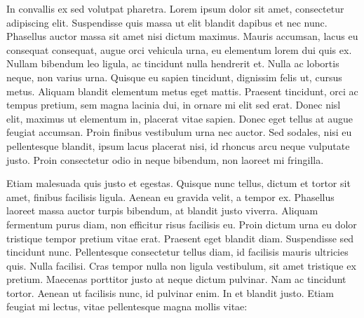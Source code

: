 \documentclass[12pt]{article}
\begin{document}
    In convallis ex sed volutpat pharetra. Lorem ipsum dolor sit amet, consectetur adipiscing elit. Suspendisse quis massa ut elit blandit dapibus et nec nunc. Phasellus auctor massa sit amet nisi dictum maximus. Mauris accumsan, lacus eu consequat consequat, augue orci vehicula urna, eu elementum lorem dui quis ex. Nullam bibendum leo ligula, ac tincidunt nulla hendrerit et. Nulla ac lobortis neque, non varius urna. Quisque eu sapien tincidunt, dignissim felis ut, cursus metus. Aliquam blandit elementum metus eget mattis. Praesent tincidunt, orci ac tempus pretium, sem magna lacinia dui, in ornare mi elit sed erat. Donec nisl elit, maximus ut elementum in, placerat vitae sapien. Donec eget tellus at augue feugiat accumsan. Proin finibus vestibulum urna nec auctor. Sed sodales, nisi eu pellentesque blandit, ipsum lacus placerat nisi, id rhoncus arcu neque vulputate justo. Proin consectetur odio in neque bibendum, non laoreet mi fringilla.
    
    Etiam malesuada quis justo et egestas. Quisque nunc tellus, dictum et tortor sit amet, finibus facilisis ligula. Aenean eu gravida velit, a tempor ex. Phasellus laoreet massa auctor turpis bibendum, at blandit justo viverra. Aliquam fermentum purus diam, non efficitur risus facilisis eu. Proin dictum urna eu dolor tristique tempor pretium vitae erat. Praesent eget blandit diam. Suspendisse sed tincidunt nunc. Pellentesque consectetur tellus diam, id facilisis mauris ultricies quis. Nulla facilisi. Cras tempor nulla non ligula vestibulum, sit amet tristique ex pretium. Maecenas porttitor justo at neque dictum pulvinar. Nam ac tincidunt tortor. Aenean ut facilisis nunc, id pulvinar enim. In et blandit justo. Etiam feugiat mi lectus, vitae pellentesque magna mollis vitae:
\end{document}
